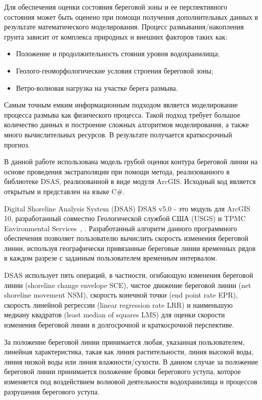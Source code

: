 \documentclass[732,14pt,final]{studrep}
\begin{document}
Для обеспечения оценки состояния береговой зоны и ее перспективного состояния может быть оценено при помощи получения дополнительных данных в результате математического моделирования. Процесс размывания/накопления грунта зависит от комплекса природных и внешних факторов таких как:
\begin{itemize}
\item Положение и продолжительность стояния уровня водохранилища;
\item Геолого-геоморфологические условия строения  береговой зоны;
\item Ветро-волновая нагрузка на участке берега размыва.
\end{itemize}

Самым точным емким  информационным подходом является моделирование процесса размыва как физического процесса. Такой подход требует большое количество данных и построение сложных алгоритмов моделирования, а также много вычислительных ресурсов. В результате получается краткосрочный прогноз.

В данной работе использована модель грубой оценки контура береговой линии на основе проведения экстраполяции при помощи метода, реализованного в библиотеке DSAS\cite{isha20}, реализованной в виде модуля ArcGIS. Исходный код является открытым и представлен на языке C\#.

Digital Shoreline Analysis System (DSAS) DSAS v5.0 - это модуль для ArcGIS 10, разработанный совместно Геологической службой США (USGS) и TPMC Environmental Services~\cite{himmel09}, \cite{himmel18}. Разработанный алгоритм данного программного обеспечения позволяет пользователю вычислить скорость изменения береговой линии, используя географически привязанные береговые линии временных рядов в каждом разрезе с заданным пользователем временным интервалом.

DSAS использует пять операций, в частности, огибающую изменения береговой линии (shoreline change envelope SCE), чистое движение береговой линии (net shoreline movement NSM), скорость конечной точки (end point rate EPR), скорость линейной регрессии (linear regression rate LRR) и наименьшую медиану квадратов (least median of squares LMS) для оценки скорости изменения береговой линии в долгосрочной и краткосрочной перспективе.

За положение береговой линии принимается любая, указанная пользователем, линейная характеристика, такая как линия растительности, линия высокой воды, линия низкой воды или линия влажности/сухости. В данном случае за положение береговой линии принимается положение бровки берегового уступа, которое изменяется под воздействием волновой деятельности водохранилища и процессов разрушения берегового уступа.
\end{document}
